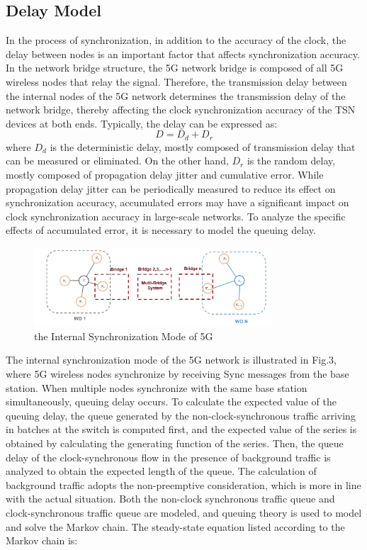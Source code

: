 \documentclass[english]{cccconf}
\begin{document}
\subsection{Delay Model}
In the process of synchronization, in addition to the accuracy of the clock, the delay between nodes is an important factor that affects synchronization accuracy. In the network bridge structure, the 5G network bridge is composed of all 5G wireless nodes that relay the signal. Therefore, the transmission delay between the internal nodes of the 5G network determines the transmission delay of the network bridge, thereby affecting the clock synchronization accuracy of the TSN devices at both ends. Typically, the delay can be expressed as:
\begin{equation}
	D=D_d+D_r
\end{equation}
where $D_d$ is the deterministic delay, mostly composed of transmission delay that can be measured or eliminated. On the other hand, $D_r$ is the random delay, mostly composed of propagation delay jitter and cumulative error. While propagation delay jitter can be periodically measured to reduce its effect on synchronization accuracy\cite{9064350}, accumulated errors may have a significant impact on clock synchronization accuracy in large-scale networks. To analyze the specific effects of accumulated error, it is necessary to model the queuing delay.
\begin{figure}[htbp]
	\centering
	\setcounter{figure}{2}
	\includegraphics[width=3.5in]{fig21.png}
	\caption{the Internal Synchronization Mode of 5G }
\end{figure}
The internal synchronization mode of the 5G network is illustrated in Fig.3, where 5G wireless nodes synchronize by receiving Sync messages from the base station. When multiple nodes synchronize with the same base station simultaneously, queuing delay occurs. To calculate the expected value of the queuing delay, the queue generated by the non-clock-synchronous traffic arriving in batches at the switch is computed first, and the expected value of the series is obtained by calculating the generating function of the series. Then, the queue delay of the clock-synchronous flow in the presence of background traffic is analyzed to obtain the expected length of the queue. The calculation of background traffic adopts the non-preemptive consideration, which is more in line with the actual situation. Both the non-clock synchronous traffic queue and clock-synchronous traffic queue are modeled, and queuing theory is used to model and solve the Markov chain. The steady-state equation listed according to the Markov chain is:
\end{document}
